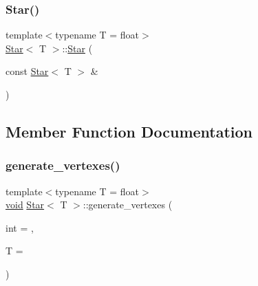 \mbox{\label{classStar_a047ce2a8d4fb409858555aee98b33c93}} 
\subsubsection{\texorpdfstring{Star()}{Star()}\hspace{0.1cm}{\footnotesize\ttfamily [4/4]}}
{\footnotesize\ttfamily template$<$typename T  = float$>$ \\
\mbox{\hyperlink{classStar}{Star}}$<$ T $>$\+::\mbox{\hyperlink{classStar}{Star}} (\begin{DoxyParamCaption}\item[{const \mbox{\hyperlink{classStar}{Star}}$<$ T $>$ \&}]{ }\end{DoxyParamCaption})\hspace{0.3cm}{\ttfamily [default]}}



\subsection{Member Function Documentation}
\mbox{\label{classStar_ac9ce42a8f7289484594f7f0ab5124849}} 
\subsubsection{\texorpdfstring{generate\+\_\+vertexes()}{generate\_vertexes()}\hspace{0.1cm}{\footnotesize\ttfamily [1/3]}}
{\footnotesize\ttfamily template$<$typename T  = float$>$ \\
\mbox{\hyperlink{glad_8h_a950fc91edb4504f62f1c577bf4727c29}{void}} \mbox{\hyperlink{classStar}{Star}}$<$ T $>$\+::generate\+\_\+vertexes (\begin{DoxyParamCaption}\item[{int}]{ = {},  }\item[{T}]{ = {} }\end{DoxyParamCaption})\hspace{0.3cm}{\ttfamily [private]}}

\mbox{\label{classStar_ab46cbc7aca971bc1c07b8d4afe8fba37}} 
